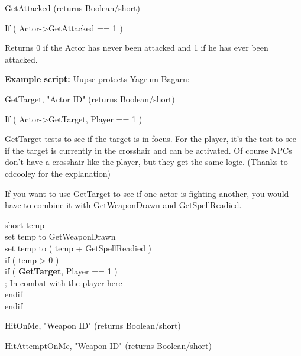 \documentclass[
]{article}
\begin{document}
GetAttacked (returns Boolean/short)

If ( Actor-\textgreater GetAttacked == 1 )

Returns 0 if the Actor has never been attacked and 1 if he has ever been
attacked.

\textbf{Example script:} Uupse protects Yagrum Bagarn:



GetTarget, "Actor ID" (returns Boolean/short)

If ( Actor-\textgreater GetTarget, Player == 1 )

GetTarget tests to see if the target is in focus. For the player, it's
the test to see if the target is currently in the crosshair and can be
activated. Of course NPCs don't have a crosshair like the player, but
they get the same logic. (Thanks to cdcooley for the explanation)

If you want to use GetTarget to see if one actor is fighting another,
you would have to combine it with GetWeaponDrawn and GetSpellReadied.

short temp\\
set temp to GetWeaponDrawn\\
set temp to ( temp + GetSpellReadied )\\
if ( temp \textgreater{} 0 )\\
\hspace*{0.333em}\hspace*{0.333em}\hspace*{0.333em}\hspace*{0.333em}if (
\textbf{GetTarget}, Player == 1 )\\
\hspace*{0.333em}\hspace*{0.333em}\hspace*{0.333em}\hspace*{0.333em}\hspace*{0.333em}\hspace*{0.333em}
; In combat with the player here\\
\hspace*{0.333em}\hspace*{0.333em}\hspace*{0.333em}\hspace*{0.333em}endif\\
endif

HitOnMe, "Weapon ID" (returns Boolean/short)

HitAttemptOnMe, "Weapon ID" (returns Boolean/short)
\end{document}
